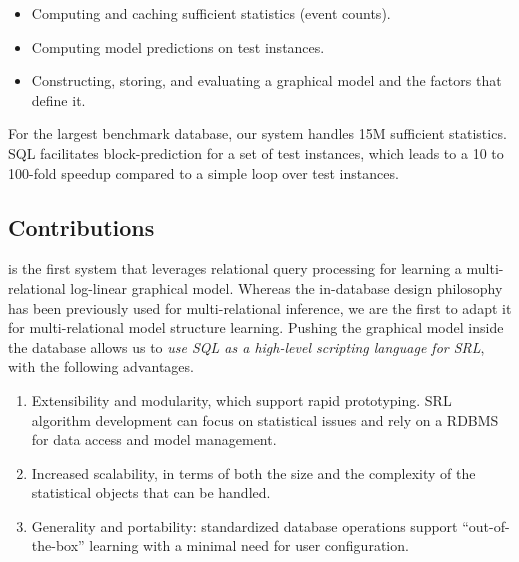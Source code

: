 \begin{itemize}
\item Computing and caching sufficient statistics (event counts).
\item Computing model predictions on test instances.
\item Constructing, storing, and evaluating a graphical model and the factors that define it.
\end{itemize}


For the largest benchmark database, our system handles 15M sufficient statistics. 
SQL facilitates block-prediction for a set of test instances, which leads to a 10 to 100-fold speedup compared to a simple loop over test instances.

\subsection{Contributions}
\FB  is the first system that leverages relational query processing for learning a multi-relational log-linear graphical model. Whereas the in-database design philosophy has been previously used for multi-relational inference, we are the first to adapt it for multi-relational model structure learning. Pushing the graphical model inside the database 
allows us to {\em use SQL as a high-level scripting language for SRL}, with the following advantages.

\begin{enumerate}
\item Extensibility and modularity, which support rapid prototyping. SRL algorithm development can focus on statistical issues and rely on a RDBMS for data access and model management.
\item Increased scalability, in terms of both the size and the complexity of the statistical objects that can be handled.
\item Generality and portability: standardized database operations support ``out-of-the-box'' learning with a minimal need for user configuration.
\end{enumerate}


